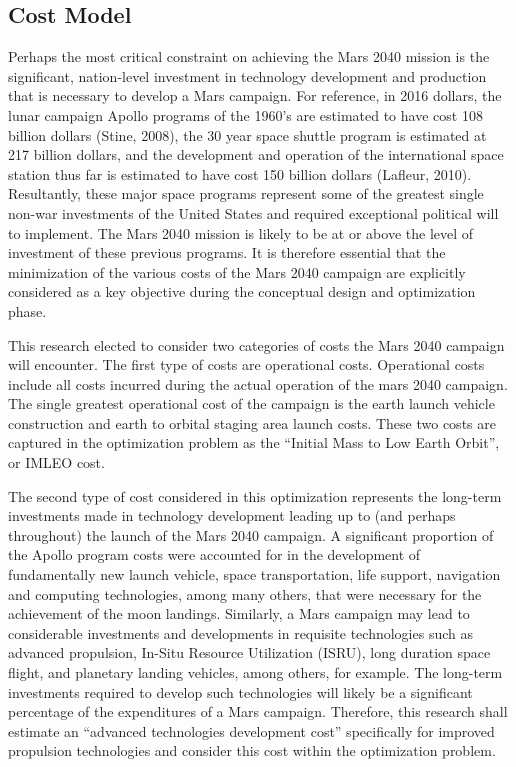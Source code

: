 \documentclass[]{aiaa-pretty}
\begin{document}
\subsection{Cost Model}
Perhaps the most critical constraint on achieving the Mars 2040 mission is the significant, nation-level investment in technology development and production that is necessary to develop a Mars campaign. For reference, in 2016 dollars, the lunar campaign Apollo programs of the 1960’s are estimated to have cost 108 billion dollars (Stine, 2008), the 30 year space shuttle program is estimated at 217 billion dollars, and the development and operation of the international space station thus far is estimated to have cost 150 billion dollars (Lafleur, 2010). Resultantly, these major space programs represent some of the greatest single non-war investments of the United States and required exceptional political will to implement. The Mars 2040 mission is likely to be at or above the level of investment of these previous programs. It is therefore essential that the minimization of the various costs of the Mars 2040 campaign are explicitly considered as a key objective during the conceptual design and optimization phase.

This research elected to consider two categories of costs the Mars 2040 campaign will encounter. The first type of costs are operational costs. Operational costs include all costs incurred during the actual operation of the mars 2040 campaign. The single greatest operational cost of the campaign is the earth launch vehicle construction and earth to orbital staging area launch costs. These two costs are captured in the optimization problem as the “Initial Mass to Low Earth Orbit”, or IMLEO cost. 

The second type of cost considered in this optimization represents the long-term investments made in technology development leading up to (and perhaps throughout) the launch of the Mars 2040 campaign. A significant proportion of the Apollo program costs were accounted for in the development of fundamentally new launch vehicle, space transportation, life support, navigation and computing technologies, among many others, that were necessary for the achievement of the moon landings. Similarly, a Mars campaign may lead to considerable investments and developments in requisite technologies such as advanced propulsion, In-Situ Resource Utilization (ISRU), long duration space flight, and planetary landing vehicles, among others, for example. The long-term investments required to develop such technologies will likely be a significant percentage of the expenditures of a Mars campaign. Therefore, this research shall estimate an “advanced technologies development cost” specifically for improved propulsion technologies and consider this cost within the optimization problem. 
\end{document}
